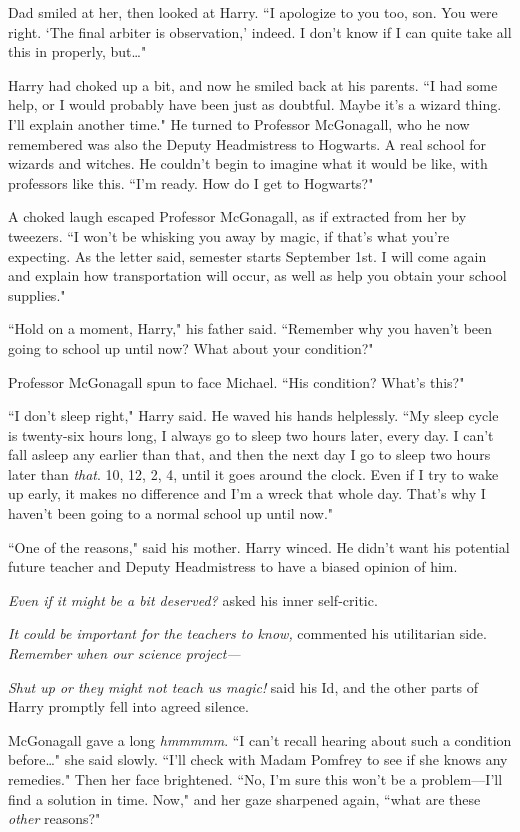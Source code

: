 Dad smiled at her, then looked at Harry. ``I apologize to you too, son. You were right. `The final arbiter is observation,' indeed. I don't know if I can quite take all this in properly, but{\ldots}"

Harry had choked up a bit, and now he smiled back at his parents. ``I had some help, or I would probably have been just as doubtful. Maybe it's a wizard thing. I'll explain another time." He turned to Professor McGonagall, who he now remembered was also the Deputy Headmistress to Hogwarts. A real school for wizards and witches. He couldn't begin to imagine what it would be like, with professors like this. ``I'm ready. How do I get to Hogwarts?"

A choked laugh escaped Professor McGonagall, as if extracted from her by tweezers. ``I won't be whisking you away by magic, if that's what you're expecting. As the letter said, semester starts September 1st. I will come again and explain how transportation will occur, as well as help you obtain your school supplies."

``Hold on a moment, Harry," his father said. ``Remember why you haven't been going to school up until now? What about your condition?"

Professor McGonagall spun to face Michael. ``His condition? What's this?"

``I don't sleep right," Harry said. He waved his hands helplessly. ``My sleep cycle is twenty-six hours long, I always go to sleep two hours later, every day. I can't fall asleep any earlier than that, and then the next day I go to sleep two hours later than \emph{that}. 10\pm, 12\am, 2\am, 4\am, until it goes around the clock. Even if I try to wake up early, it makes no difference and I'm a wreck that whole day. That's why I haven't been going to a normal school up until now."

``One of the reasons," said his mother. Harry winced. He didn't want his potential future teacher and Deputy Headmistress to have a biased opinion of him.

\emph{Even if it might be a bit deserved?} asked his inner self-critic.

\emph{It could be important for the teachers to know,} commented his utilitarian side. \emph{Remember when our science project---}

\emph{Shut up or they might not teach us magic!} said his Id, and the other parts of Harry promptly fell into agreed silence.

McGonagall gave a long \emph{hmmmmm}. ``I can't recall hearing about such a condition before{\ldots}" she said slowly. ``I'll check with Madam Pomfrey to see if she knows any remedies." Then her face brightened. ``No, I'm sure this won't be a problem---I'll find a solution in time. Now," and her gaze sharpened again, ``what are these \emph{other} reasons?"

